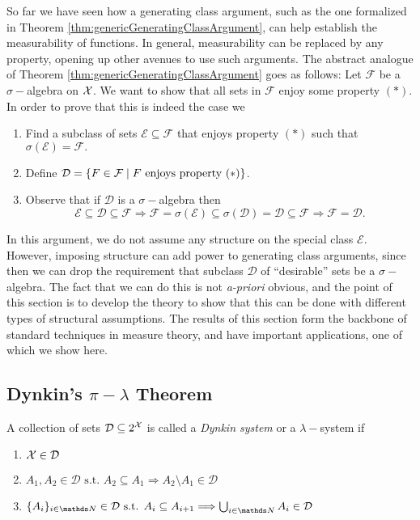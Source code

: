 So far we have seen how a generating class argument, such as the one
formalized in Theorem \ref{thm:genericGeneratingClassArgument}, can
help establish the measurability of functions. In general, measurability
can be replaced by any property, opening up other avenues to use such
arguments. The abstract analogue of Theorem \ref{thm:genericGeneratingClassArgument}
goes as follows: Let $\mathcal{F}$ be a $\sigma-$algebra on $\mathcal{X}$.
We want to show that all sets in $\mathcal{F}$ enjoy some property
$\left(*\right)$. In order to prove that this is indeed the case
we
\begin{enumerate}
\item Find a subclass of sets $\mathcal{E}\subseteq\mathcal{F}$ that enjoys
property $\left(*\right)$ such that $\sigma\left(\mathcal{E}\right)=\mathcal{F}.$
\item Define $\mathcal{D}=\left\{ F\in\mathcal{F}\mid F\ \text{enjoys property }\text{\ensuremath{\left(*\right)}}\right\} $.
\item Observe that if $\mathcal{D}$ is a $\sigma-$algebra then
\[
\mathcal{E}\subseteq\mathcal{D}\subseteq\mathcal{F}\Longrightarrow\mathcal{F}=\sigma\left(\mathcal{E}\right)\subseteq\sigma\left(\mathcal{D}\right)=\mathcal{D}\subseteq\mathcal{F}\Longrightarrow\mathcal{F}=\mathcal{D}.
\]
\end{enumerate}
In this argument, we do not assume any structure on the special class
$\mathcal{E}.$ However, imposing structure can add power to generating
class arguments, since then we can drop the requirement that subclass
$\mathcal{D}$ of ``desirable'' sets be a $\sigma-$algebra. The
fact that we can do this is not \emph{a-priori }obvious, and the point
of this section is to develop the theory to show that this can be
done with different types of structural assumptions. The results of
this section form the backbone of standard techniques in measure theory,
and have important applications, one of which we show here.

\subsection{Dynkin's $\pi-\lambda$ Theorem}
\begin{defn}
\label{def:dynkinSystem}A collection of sets $\mathcal{D}\subseteq2^{\mathcal{X}}$
is called a \emph{Dynkin system }or a $\lambda-$system if

\begin{enumerate}[label=(\roman*),leftmargin=.1\linewidth,rightmargin=.4\linewidth]
	\item $ \mathcal{X} \in \mathcal{D} $
	\item $ A_1, A_2 \in \mathcal{D} \text{ s.t. } A_2 \subseteq A_1 \Longrightarrow A_2\setminus A_1 \in \mathcal{D} $
	\item $\{A_i\}_{i\in\N} \in \mathcal{D} \text{ s.t. } A_i \subseteq A_{i+1} \Longrightarrow \bigcup_{i\in\N} A_i \in \mathcal{D} $
\end{enumerate}
\end{defn}

